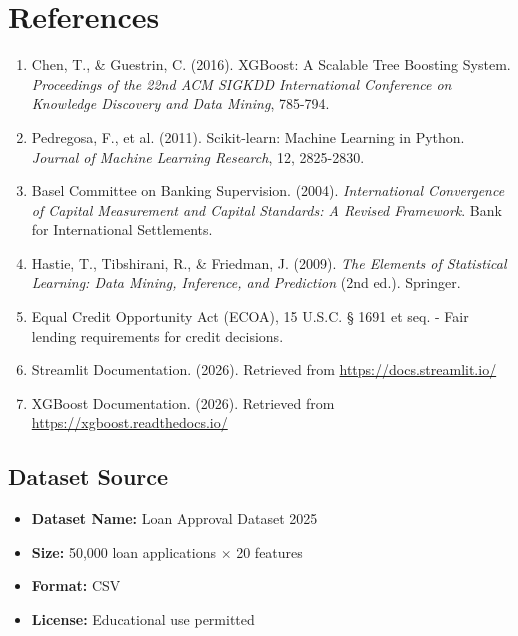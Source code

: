 \documentclass[12pt,a4paper]{article}
\begin{document}
\newpage

\section{References}

\begin{enumerate}
    \item Chen, T., \& Guestrin, C. (2016). XGBoost: A Scalable Tree Boosting System. \textit{Proceedings of the 22nd ACM SIGKDD International Conference on Knowledge Discovery and Data Mining}, 785-794.
    
    \item Pedregosa, F., et al. (2011). Scikit-learn: Machine Learning in Python. \textit{Journal of Machine Learning Research}, 12, 2825-2830.
    
    \item Basel Committee on Banking Supervision. (2004). \textit{International Convergence of Capital Measurement and Capital Standards: A Revised Framework}. Bank for International Settlements.
    
    \item Hastie, T., Tibshirani, R., \& Friedman, J. (2009). \textit{The Elements of Statistical Learning: Data Mining, Inference, and Prediction} (2nd ed.). Springer.
    
    \item Equal Credit Opportunity Act (ECOA), 15 U.S.C. § 1691 et seq. - Fair lending requirements for credit decisions.
    
    \item Streamlit Documentation. (2026). Retrieved from \url{https://docs.streamlit.io/}
    
    \item XGBoost Documentation. (2026). Retrieved from \url{https://xgboost.readthedocs.io/}
\end{enumerate}

\subsection{Dataset Source}

\begin{itemize}
    \item \textbf{Dataset Name:} Loan Approval Dataset 2025
    \item \textbf{Size:} 50,000 loan applications $\times$ 20 features
    \item \textbf{Format:} CSV
    \item \textbf{License:} Educational use permitted
\end{itemize}
\end{document}
